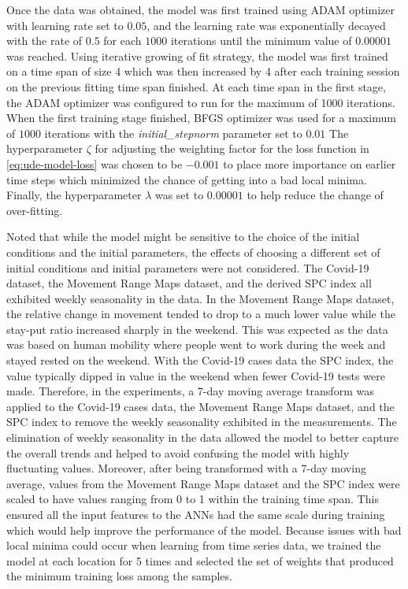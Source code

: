 Once the data was obtained, the model was first trained using ADAM optimizer with learning rate set to $0.05$, and the learning rate was exponentially decayed with the rate of $0.5$ for each $1000$ iterations until the minimum value of $0.00001$ was reached.
Using iterative growing of fit strategy, the model was first trained on a time span of size 4 which was then increased by 4 after each training session on the previous fitting time span finished.
At each time span in the first stage, the ADAM optimizer was configured to run for the maximum of 1000 iterations.
When the first training stage finished, BFGS optimizer was used for a maximum of $1000$ iterations with the \textit{initial\_stepnorm} parameter set to $0.01$
The hyperparameter $\zeta$ for adjusting the weighting factor for the loss function in \autoref{eq:ude-model-loss} was chosen to be $-0.001$ to place more importance on earlier time steps which minimized the chance of getting into a bad local minima.
Finally, the hyperparameter $\lambda$ was set to $0.00001$ to help reduce the change of over-fitting.

Noted that while the model might be sensitive to the choice of the initial conditions and the initial parameters, the effects of choosing a different set of initial conditions and initial parameters were not considered.
The Covid-19 dataset, the Movement Range Maps dataset, and the derived \gls{SPC} index all exhibited weekly seasonality in the data.
In the Movement Range Maps dataset, the relative change in movement tended to drop to a much lower value while the stay-put ratio increased sharply in the weekend.
This was expected as the data was based on human mobility where people went to work during the week and stayed rested on the weekend.
With the Covid-19 cases data the \gls{SPC} index, the value typically dipped in value in the weekend when fewer Covid-19 tests were made.
Therefore, in the experiments, a 7-day moving average transform was applied to the Covid-19 cases data, the Movement Range Maps dataset, and the \gls{SPC} index to remove the weekly seasonality exhibited in the measurements.
The elimination of weekly seasonality in the data allowed the model to better capture the overall trends and helped to avoid confusing the model with highly fluctuating values.
Moreover, after being transformed with a 7-day moving average, values from the Movement Range Maps dataset and the \gls{SPC} index were scaled to have values ranging from 0 to 1 within the training time span.
This ensured all the input features to the \glspl{ANN} had the same scale during training which would help improve the performance of the model.
Because issues with bad local minima could occur when learning from time series data, we trained the model at each location for 5 times and selected the set of weights that produced the minimum training loss among the samples.